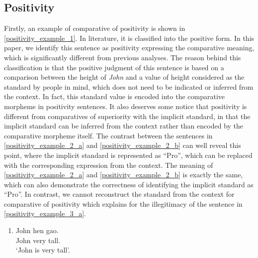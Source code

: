 \documentclass{ctexart}
\begin{document}
\subsection{Positivity}

\noindent
Firstly, an example of comparative of positivity is shown in \ref{positivity_example_1}. In literature, it is classified into the positive form. In this paper, we identify this sentence as positivity expressing the comparative meaning, which is significantly different from previous analyses. The reason behind this classification is that the positive judgment of this sentence is based on a comparison between the height of \textit{John} and a value of height considered as the standard by people in mind, which does not need to be indicated or inferred from the context. In fact, this standard value is encoded into the comparative morpheme in positivity sentences. It also deserves some notice that positivity is different from comparatives of superiority with the implicit standard, in that the implicit standard can be inferred from the context rather than encoded by the comparative morpheme itself. The contrast between the sentences in \ref{positivity_example_2_a} and \ref{positivity_example_2_b} can well reveal this point, where the implicit standard is represented as ``Pro'', which can be replaced with the corresponding expression from the context. The meaning of \ref{positivity_example_2_a} and \ref{positivity_example_2_b} is exactly the same, which can also demonstrate the correctness of identifying the implicit standard as ``Pro''. In contrast, we cannot reconstruct the standard from the context for comparative of positivity which explains for the illegitimacy of the sentence in \ref{positivity_example_3_a}.

\begin{enumerate}
    \item \label{positivity_example_1}
    John hen gao.  \\
    John very tall. \\
    `John is very tall'.
\end{enumerate}
\end{document}
